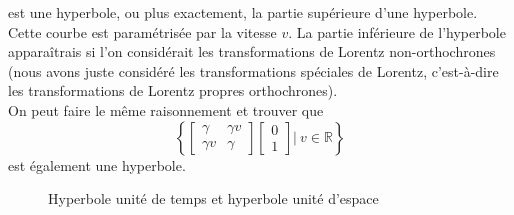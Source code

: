 \documentclass[a4paper,11pt]{report}
\theoremstyle{definition}
\theoremstyle{plain}
\theoremstyle{definition}
\theoremstyle{remark}
\newcommand{\x}{\times}
\renewcommand{\u}[1]{\underline{#1}}
\begin{document}
            est une hyperbole, ou plus exactement, la partie supérieure d'une hyperbole. Cette courbe est paramétrisée par la vitesse $v$. La partie inférieure de l'hyperbole apparaîtrais si l'on considérait les transformations de Lorentz non-orthochrones (nous avons juste considéré les transformations spéciales de Lorentz, c'est-à-dire les transformations de Lorentz propres orthochrones).\\
            
            On peut faire le même raisonnement et trouver que 
            \begin{equation}
            \left\{ \begin{bmatrix}
                \gamma & \gamma v \\
                \gamma v & \gamma 
            \end{bmatrix}
            \begin{bmatrix}
                    0\\
                    1
            \end{bmatrix} \Bigg\vert~ v\in\mathbb{R}\right\}
            \end{equation}
            est également une hyperbole.
            
            \begin{figure}[H]
            \centering
            \caption{Hyperbole unité de temps et hyperbole unité d'espace}
            \label{fig:my_label}
            \end{figure}
            
\end{document}
